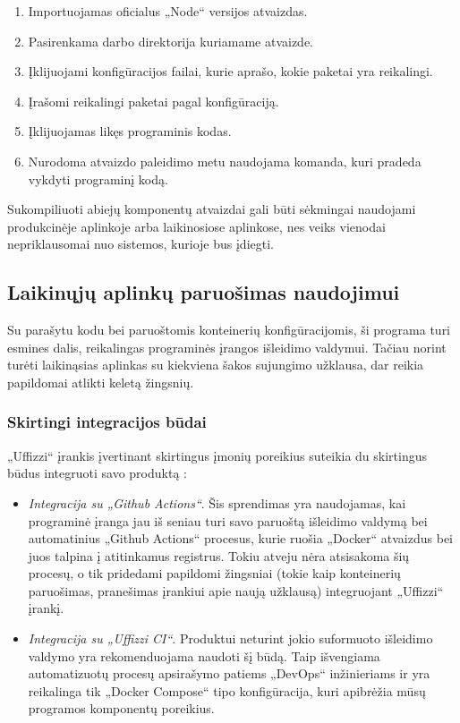 \documentclass{VUMIFPSkursinis}
\begin{document}
\begin{enumerate}
  \item Importuojamas oficialus „Node“ versijos atvaizdas.
  \item Pasirenkama darbo direktorija kuriamame atvaizde.
  \item Įklijuojami konfigūracijos failai, kurie aprašo, kokie paketai yra reikalingi.
  \item Įrašomi reikalingi paketai pagal konfigūraciją.
  \item Įklijuojamas likęs programinis kodas.
  \item Nurodoma atvaizdo paleidimo metu naudojama komanda, kuri pradeda vykdyti programinį kodą.
\end{enumerate}

Sukompiliuoti abiejų komponentų atvaizdai gali būti sėkmingai naudojami produkcinėje aplinkoje arba laikinosiose aplinkose, nes veiks vienodai nepriklausomai nuo sistemos, kurioje bus įdiegti.

\subsection{Laikinųjų aplinkų paruošimas naudojimui}

Su parašytu kodu bei paruoštomis konteinerių konfigūracijomis, ši programa turi esmines dalis, reikalingas programinės įrangos išleidimo valdymui. Tačiau norint turėti laikinąsias aplinkas su kiekviena šakos sujungimo užklausa, dar reikia papildomai atlikti keletą žingsnių.

    \subsubsection{Skirtingi integracijos būdai}

„Uffizzi“ įrankis įvertinant skirtingus įmonių poreikius suteikia du skirtingus būdus integruoti savo produktą \cite{SaltKeturioliktas}:

\begin{itemize}
  \item \textit{Integracija su „Github Actions“}. Šis sprendimas yra naudojamas, kai programinė įranga jau iš seniau turi savo paruoštą išleidimo valdymą bei automatinius „Github Actions“ procesus, kurie ruošia „Docker“ atvaizdus bei juos talpina į atitinkamus registrus. Tokiu atveju nėra atsisakoma šių procesų, o tik pridedami papildomi žingsniai (tokie kaip konteinerių paruošimas, pranešimas įrankiui apie naują užklausą) integruojant „Uffizzi“ įrankį.

  \item \textit{Integracija su „Uffizzi CI“}. Produktui neturint jokio suformuoto išleidimo valdymo yra rekomenduojama naudoti šį būdą. Taip išvengiama automatizuotų procesų apsirašymo patiems „DevOps“ inžinieriams ir yra reikalinga tik „Docker Compose“ tipo konfigūracija, kuri apibrėžia mūsų programos komponentų poreikius.


\end{itemize}
    
\end{document}
